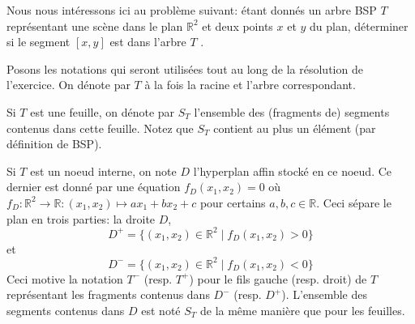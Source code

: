 
Nous nous intéressons ici au problème suivant: \og étant donnés
un arbre BSP $T$ représentant une scène dans le plan $\mathbb{R}^2$
et deux points $x$ et $y$ du plan, déterminer si le segment $[x, y]$
est dans l'arbre $T$ \fg.

Posons les notations qui seront utilisées tout au long de la
résolution de l'exercice. On dénote par $T$ à la fois la
racine et l'arbre correspondant.

Si $T$ est une feuille, on dénote par $S_T$ l'ensemble des
(fragments de) segments contenus dans cette feuille.
Notez que $S_T$ contient au plus un élément (par définition de BSP).

Si $T$ est un noeud interne, on note $D$ l'hyperplan affin stocké
en ce noeud. Ce dernier est donné par une équation $f_D(x_1, x_2) = 0$
où $f_D: \mathbb{R}^2 \to \mathbb{R}: (x_1, x_2)\mapsto a x_1 + b x_2 +c$
pour certains $a, b, c\in\mathbb{R}$. Ceci sépare le plan en trois
parties: la droite $D$,
$$D^+=\{(x_1, x_2)\in\mathbb{R}^2\mid f_D(x_1, x_2) > 0\}$$ et
$$D^-=\{(x_1, x_2)\in\mathbb{R}^2\mid f_D(x_1, x_2) < 0\}$$
Ceci motive la notation $T^-$ (resp. $T^+$) pour le fils gauche
(resp. droit) de $T$ représentant les fragments contenus dans $D^-$
(resp. $D^+$). L'ensemble des segments contenus dans $D$ est noté
$S_T$ de la même manière que pour les feuilles.
